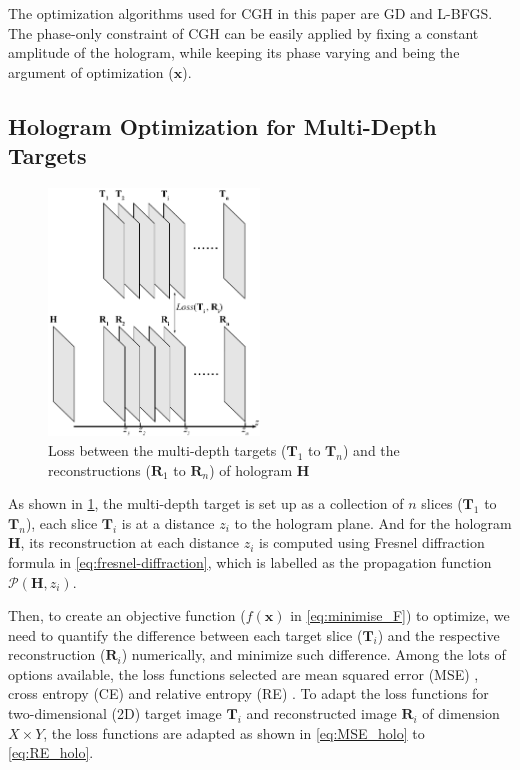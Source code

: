 The optimization algorithms used for CGH in this paper are GD and L-BFGS. The phase-only constraint of CGH can be easily applied by fixing a constant amplitude of the hologram, while keeping its phase varying and being the argument of optimization ($\textbf{x}$).


\subsection{Hologram Optimization for Multi-Depth Targets}

\begin{figure}[h!]
	\centering
	\includegraphics[width=0.5\textwidth]{Fresnel_slice_illustration}
	\caption{Loss between the multi-depth targets ($\textbf{T}_1$ to $\textbf{T}_n$) and the reconstructions ($\textbf{R}_1$ to $\textbf{R}_n$) of hologram $\textbf{H}$}
	\label{fig:Fresnel_slice_illustration}
\end{figure}

As shown in \cref{fig:Fresnel_slice_illustration}, the multi-depth target is set up as a collection of $n$ slices ($\textbf{T}_1$ to $\textbf{T}_n$), each slice $\textbf{T}_i$ is at a distance $z_i$ to the hologram plane. And for the hologram $\textbf{H}$, its reconstruction at each distance $z_i$ is computed using Fresnel diffraction formula in \cref{eq:fresnel-diffraction}, which is labelled as the propagation function $\mathcal{P}(\textbf{H}, z_i)$.

Then, to create an objective function ($f(\textbf{x})$ in \cref{eq:minimise_F}) to optimize, we need to quantify the difference between each target slice ($\textbf{T}_i$) and the respective reconstruction ($\textbf{R}_i$) numerically, and minimize such difference. Among the lots of options available, the loss functions selected are mean squared error (MSE) \cite{MSE_REF}, cross entropy (CE) \cite{cybenko1998mathematics} and relative entropy (RE) \cite{Kullback1951}. To adapt the loss functions for two-dimensional (2D) target image $\textbf{T}_i$ and reconstructed image $\textbf{R}_i$ of dimension $X\times Y$, the loss functions are adapted as shown in \cref{eq:MSE_holo} to \cref{eq:RE_holo}.

